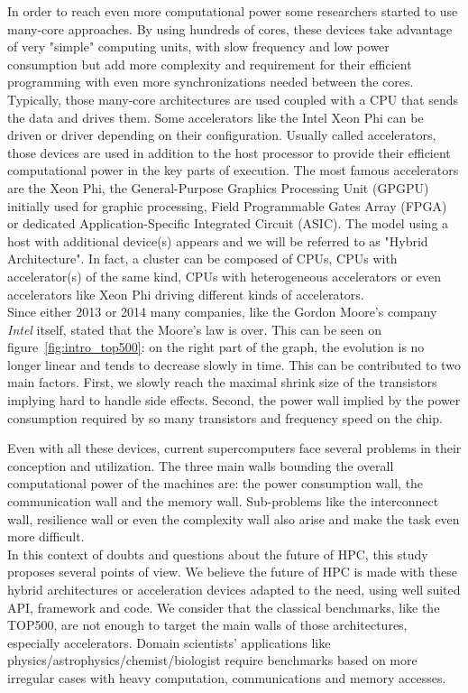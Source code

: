 In order to reach even more computational power some researchers started to use many-core approaches. 
By using hundreds of cores, these devices take advantage of very "simple" computing units, with slow frequency and low power consumption but add more complexity and requirement for their efficient programming with even more synchronizations needed between the cores. 
Typically, those many-core architectures are used coupled with a CPU that sends the data and drives them.
Some accelerators like the Intel Xeon Phi can be driven or driver depending on their configuration. 
Usually called accelerators, those devices are used in addition to the host processor to provide their efficient computational power in the key parts of execution. 
The most famous accelerators are the Xeon Phi, the General-Purpose Graphics Processing Unit (GPGPU) initially used for graphic processing, Field Programmable Gates Array (FPGA) or dedicated Application-Specific Integrated Circuit (ASIC).
The model using a host with additional device(s) appears and we will be referred to as "Hybrid Architecture".
In fact, a cluster can be composed of CPUs, CPUs with accelerator(s) of the same kind, CPUs with heterogeneous accelerators or even accelerators like Xeon Phi driving different kinds of accelerators.\\

Since either 2013 or 2014 many companies, like the Gordon Moore's company \textit{Intel} itself, stated that the Moore's law is over. 
This can be seen on figure~\ref{fig:intro_top500}: on the right part of the graph, the evolution is no longer linear and tends to decrease slowly in time. 
This can be contributed to two main factors. 
First, we slowly reach the maximal shrink size of the transistors implying hard to handle side effects. 
Second, the power wall implied by the power consumption required by so many transistors and frequency speed on the chip.

Even with all these devices, current supercomputers face several problems in their conception and utilization. 
The three main walls bounding the overall computational power of the machines are: the power consumption wall, the communication wall and the memory wall.  
Sub-problems like the interconnect wall, resilience wall or even the complexity wall also arise and make the task even more difficult.\\

In this context of doubts and questions about the future of HPC, this study proposes several points of view. 
We believe the future of HPC is made with these hybrid architectures or acceleration devices adapted to the need, using well suited API, framework and code.
We consider that the classical benchmarks, like the TOP500, are not enough to target the main walls of those architectures, especially accelerators. 
Domain scientists’ applications like physics/astrophysics/chemist/biologist require benchmarks based on more irregular cases with heavy computation, communications and memory accesses. 

